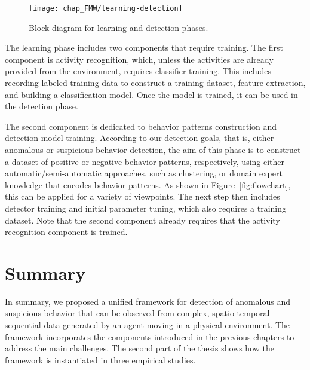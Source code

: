 \begin{figure}[!h]
\centering
\texttt{[image: chap\_FMW/learning-detection]}
\caption{Block diagram for learning and detection phases.}
\label{fig:learning-detection}
\end{figure}

The learning phase includes two components that require training. The first component is activity recognition, which, unless the activities are already provided from the environment, requires classifier training. This includes recording labeled training data to construct a training dataset, feature extraction, and building a classification model. Once the model is trained, it can be used in the detection phase. 


The second component is dedicated to behavior patterns construction and detection model training. According to our detection goals, that is, either anomalous or suspicious behavior detection, the aim of this phase is to construct a dataset of positive or negative behavior patterns, respectively, using either automatic/semi-automatic approaches, such as clustering, or domain expert knowledge that encodes behavior patterns. As shown in Figure~\ref{fig:flowchart}, this can be applied for a variety of viewpoints. The next step then includes detector training and initial parameter tuning, which also requires a training dataset.
Note that the second component already requires that the activity recognition component is trained.

\section{Summary}
In summary, we proposed a unified framework for detection of anomalous and suspicious behavior that can be observed from complex, spatio-temporal sequential data generated by an agent moving in a physical environment. The framework incorporates the components introduced in the previous chapters to address the main challenges. The second part of the thesis shows how the framework is instantiated in three empirical studies. 






